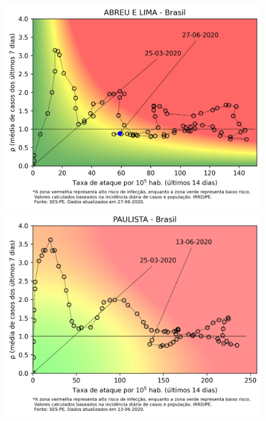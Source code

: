 \documentclass[]{article}
\begin{document}
\begin{figure}[!h]
	\begin{minipage}[t]{4cm}
	\centering
	\includegraphics[scale=0.5]{../ABREUELIMA.png}
\end{minipage}
\hspace{5cm}
\begin{minipage}[t]{4cm}
	\centering
	\includegraphics[scale=0.5]{../PAULISTA.png}
	\vspace{0.2cm}
\end{minipage}
\end{figure}
\newpage
\end{document}
